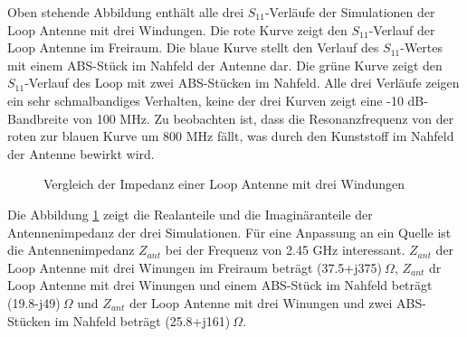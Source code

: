 Oben stehende Abbildung enthält alle drei $S_{11}$-Verläufe der Simulationen der Loop Antenne mit drei Windungen. Die rote Kurve zeigt den $S_{11}$-Verlauf der Loop Antenne im Freiraum. Die blaue Kurve stellt den Verlauf des $S_{11}$-Wertes mit einem ABS-Stück im Nahfeld der Antenne dar. Die grüne Kurve zeigt den $S_{11}$-Verlauf des Loop mit zwei ABS-Stücken im Nahfeld. Alle drei Verläufe zeigen ein sehr schmalbandiges Verhalten, keine der drei Kurven zeigt eine -10 dB-Bandbreite von 100 MHz. Zu beobachten ist, dass die Resonanzfrequenz von der roten zur blauen Kurve um 800 MHz fällt, was durch den Kunststoff im Nahfeld der Antenne bewirkt wird.

\newpage
\begin{figure}[!ht]
	\centering
	\begingroup
	
	\endgroup
	\caption{Vergleich der Impedanz einer Loop Antenne mit drei Windungen}
	\label{Impedanz_Loop_3N_Vergleich_Simulation}
\end{figure}

Die Abbildung \ref{Impedanz_Loop_3N_Vergleich_Simulation} zeigt die Realanteile und die Imaginäranteile der Antennenimpedanz der drei Simulationen. Für eine Anpassung an ein Quelle ist die Antennenimpedanz $Z_{ant}$ bei der Frequenz von 2.45 GHz interessant. $Z_{ant}$ der Loop Antenne mit drei Winungen im Freiraum beträgt (37.5+j375)$\ \Omega$, $Z_{ant}$ dr Loop Antenne mit drei Winungen und  einem ABS-Stück im Nahfeld beträgt (19.8-j49)$\ \Omega$ und
$Z_{ant}$ der Loop Antenne mit drei Winungen und zwei ABS-Stücken im Nahfeld beträgt (25.8+j161)$\ \Omega$.



